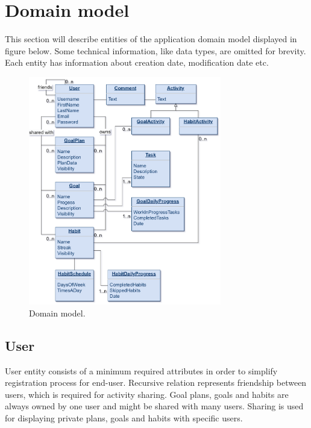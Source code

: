 
\section{Domain model}\label{sec:domain-model}

This section will describe entities of the application domain model displayed in figure below.
Some technical information, like data types, are omitted for brevity.
Each entity has information about creation date, modification date etc.

\begin{figure}[h]
    \includegraphics[width=0.75\textwidth]{images/pda-domain-model.png}
    \caption{Domain model.}
    \label{fig:domain-model}
\end{figure}


\subsection{User}\label{subsec:user}

User entity consists of a minimum required attributes in order to simplify registration process for end-user.
Recursive relation represents friendship between users, which is required for activity sharing.
Goal plans, goals and habits are always owned by one user and might be shared with many users.
Sharing is used for displaying private plans, goals and habits with specific users.


